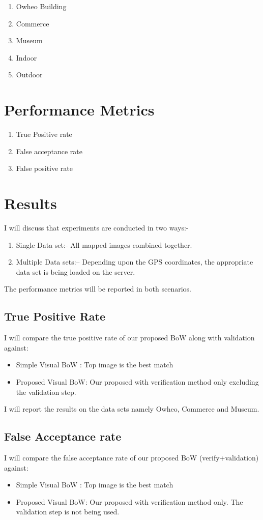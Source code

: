 \begin{enumerate}
\item Owheo Building
\item Commerce
\item Museum
\item Indoor
\item Outdoor
\end{enumerate}
\section{Performance Metrics}
\begin{enumerate}
\item True Positive rate
\item False acceptance rate
\item False positive rate
\end{enumerate}
\section{Results}
I will discuss that experiments are conducted 
in two ways:-

\begin{enumerate}
\item Single Data set:- All mapped images 
combined together.
\item Multiple Data sets:-- 
Depending upon the GPS coordinates, 
the appropriate data set is being loaded 
on the server.
\end{enumerate}

The performance metrics will be reported 
in both scenarios.

\subsection{True Positive Rate}
I will compare the true positive rate of 
our proposed BoW along with validation against:
\begin{itemize}
\item Simple Visual BoW : Top image is the best match
\item Proposed Visual BoW: Our proposed with verification method
only excluding the validation step. 
\end{itemize}

I will report the results on the data sets namely Owheo, 
Commerce and Museum.

\subsection{False Acceptance rate}
I will compare the false acceptance rate of 
our proposed BoW (verify+validation) against:
\begin{itemize}
\item Simple Visual BoW : Top image is the best match
\item Proposed Visual BoW: Our proposed with verification method
only. The validation step is not being used.
\end{itemize}

